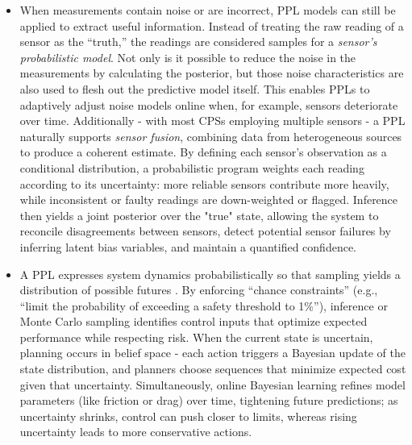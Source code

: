 \begin{multicols}{2}
  \begin{itemize}
    \item When measurements contain noise or are incorrect, PPL models can still be applied to extract useful information. Instead of treating the raw reading of a sensor as the “truth,”
  the readings are considered samples for a \textit{sensor's probabilistic model}. Not only is it possible to reduce the noise in the measurements by calculating the posterior,
  but those noise characteristics are also used to flesh out the predictive model itself.
  This enables PPLs to adaptively adjust noise models online when, for example, sensors deteriorate over time.
  Additionally - with most CPSs employing multiple sensors - a PPL naturally supports \textit{sensor fusion}, %
  combining data from heterogeneous sources to produce a coherent estimate. By defining each sensor's observation as a conditional distribution, a probabilistic program
  weights each reading according to its uncertainty: more reliable sensors contribute more heavily, while inconsistent or faulty readings are down-weighted or flagged.
  Inference then yields a joint posterior over the "true" state, allowing the system to reconcile disagreements between sensors, detect potential sensor failures by inferring
  latent bias variables, and maintain a quantified confidence.

  \item A PPL expresses system dynamics probabilistically so that sampling yields a distribution of possible futures \cite{cpsPredictiveControl}. By enforcing “chance constraints”
  (e.g., “limit the probability of exceeding a safety threshold to 1\%”), inference or Monte Carlo sampling identifies control inputs that optimize expected performance while
  respecting risk. When the current state is uncertain, planning occurs in belief space - each action triggers a Bayesian update of the state distribution, and planners
  choose sequences that minimize expected cost given that uncertainty. Simultaneously, online Bayesian learning refines model parameters (like friction or drag) over time,
  tightening future predictions; as uncertainty shrinks, control can push closer to limits, whereas rising uncertainty leads to more conservative actions.


\end{itemize}
\end{multicols}
